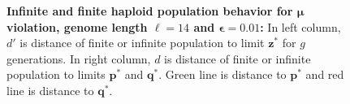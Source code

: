 \begin{figure}[h]
\begin{center}
\hspace{-3em}%
\vspace{-0.5em} \hspace{-3em}%
\caption[\textbf{Infinite and finite haploid population behavior for $\bm{\mu}$ violation, genome length $\ell = 14$ and $\bm{\epsilon} = 0.01$}]{\textbf{Infinite and finite haploid population behavior for $\bm{\mu}$ violation, genome length $\ell = 14$ and $\bm{\epsilon} = 0.01$:} 
  In left column, $d'$ is distance of finite or infinite population to limit $\bm{z}^\ast$ for $g$ generations. In right column, $d$ is distance of finite or infinite population to limits $\bm{p}^\ast$ and $\bm{q}^\ast$. Green line is distance to $\bm{p}^\ast$ and red line is distance to $\bm{q}^\ast$.}
\label{oscillation_14h_vio_mu_0.01}
\end{center}
\end{figure}

